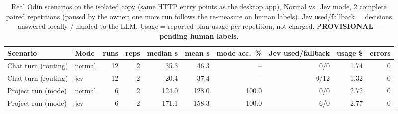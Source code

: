 \begin{table}[t]\centering\scriptsize
\caption{Real Odin scenarios on the isolated copy (same HTTP entry points as the desktop app), Normal vs.\ Jev mode, 2 complete paired repetitions (paused by the owner; one more run follows the re-measure on human labels). Jev used/fallback = decisions answered locally / handed to the LLM. Usage = reported plan usage per repetition, not charged. \textbf{PROVISIONAL -- pending human labels}.}
\label{tab:scen}
\begin{tabular}{l l r r r r r r r r}\toprule
Scenario & Mode & runs & reps & median s & mean s & mode acc.\ \% & Jev used/fallback & usage \$ & errors\\\midrule
Chat turn (routing) & normal & 12 & 2 & 35.3 & 46.3 & -- & 0/0 & 1.74 & 0 \\
Chat turn (routing) & jev & 12 & 2 & 20.4 & 37.4 & -- & 0/12 & 1.32 & 0 \\
Project run (mode) & normal & 6 & 2 & 124.0 & 128.0 & 100.0 & 0/0 & 2.72 & 0 \\
Project run (mode) & jev & 6 & 2 & 171.1 & 158.3 & 100.0 & 6/0 & 2.77 & 0 \\
\bottomrule\end{tabular}\end{table}
